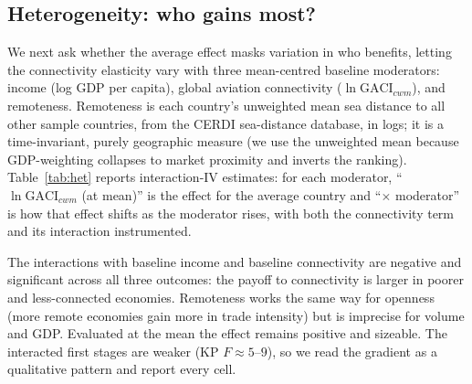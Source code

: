 \subsection{Heterogeneity: who gains most?}

We next ask whether the average effect masks variation in who benefits, letting
the connectivity elasticity vary with three mean-centred baseline moderators:
income (log GDP per capita), global aviation connectivity ($\ln\mathrm{GACI}_{cwm}$),
and remoteness. Remoteness is each country's unweighted mean sea distance to all
other sample countries, from the CERDI sea-distance database, in logs; it is a
time-invariant, purely geographic measure (we use the unweighted mean because
GDP-weighting collapses to market proximity and inverts the ranking).
Table~\ref{tab:het} reports interaction-IV estimates: for each moderator,
``$\ln\mathrm{GACI}_{cwm}$ (at mean)'' is the effect for the average country and
``$\times$ moderator'' is how that effect shifts as the moderator rises, with both
the connectivity term and its interaction instrumented.

The interactions with baseline income and baseline connectivity are negative and
significant across all three outcomes: the payoff to connectivity is larger in
poorer and less-connected economies. Remoteness works the same way for openness
(more remote economies gain more in trade intensity) but is imprecise for volume
and GDP. Evaluated at the mean the effect remains positive and sizeable. The
interacted first stages are weaker (KP $F\approx5$--$9$), so we read the gradient
as a qualitative pattern and report every cell.

